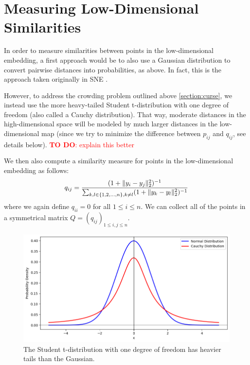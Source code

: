 \section{Measuring Low-Dimensional Similarities}
In order to measure similarities between points in the low-dimensional embedding, a first approach would be to also use a Gaussian distribution to convert pairwise distances into probabilities, as above. 
In fact, this is the approach taken originally in SNE \cite{Hinton02}.

However, to address the crowding problem outlined above \ref{section:curse}, we instead use the more heavy-tailed Student t-distribution with one degree of freedom (also called a Cauchy distribution). 
That way, moderate distances in the high-dimensional space will be modeled by much larger distances in the low-dimensional map (since we try to minimize the difference between $p_{ij}$ and $q_{ij}$, see details below). 
\textcolor{red}{\textbf{TO DO}: explain this better}

We then also compute a similarity measure for points in the low-dimensional embedding as follows: 
\begin{equation}
    q_{ij} = \frac{(1+ \lVert y_i - y_j\rVert_2^2)^{-1}}{\sum_{k, l \in \{1,2, \dots, n\}, k \neq l} (1+\lVert y_k - y_l\rVert_2^2)^{-1}}
\end{equation}
where we again define $q_{ii} = 0$ for all $1 \leq i \leq n$. We can collect all of the points in a symmetrical matrix $Q = (q_{ij})_{1 \leq i, j \leq n}$. 


\begin{figure}[h]
    \begin{center}
        \includegraphics[width=0.9\linewidth]{figures/Gaussian_Cauchy.png}
        \caption{The Student t-distribution with one degree of freedom has heavier tails than the Gaussian.}
    \end{center}
\end{figure}


